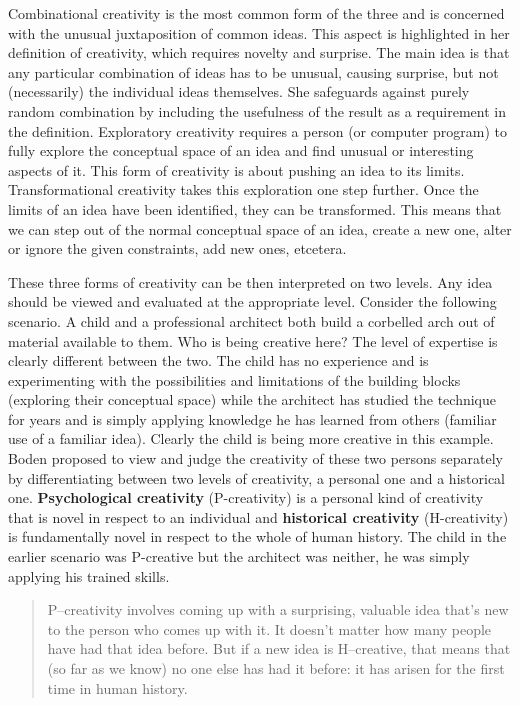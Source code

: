Combinational creativity is the most common form of the three and is concerned with the unusual juxtaposition of common ideas. This aspect is highlighted in her definition of creativity, which requires novelty and surprise. The main idea is that any particular combination of ideas has to be unusual, causing surprise, but not (necessarily) the individual ideas themselves. She safeguards against purely random combination by including the usefulness of the result as a requirement in the definition. Exploratory creativity requires a person (or computer program) to fully explore the conceptual space of an idea and find unusual or interesting aspects of it. This form of creativity is about pushing an idea to its limits. Transformational creativity takes this exploration one step further. Once the limits of an idea have been identified, they can be transformed. This means that we can step out of the normal conceptual space of an idea, create a new one, alter or ignore the given constraints, add new ones, etcetera.

These three forms of creativity can be then interpreted on two levels. Any idea should be viewed and evaluated at the appropriate level. Consider the following scenario. A child and a professional architect both build a corbelled arch out of material available to them. Who is being creative here? The level of expertise is clearly different between the two. The child has no experience and is experimenting with the possibilities and limitations of the building blocks (exploring their conceptual space) while the architect has studied the technique for years and is simply applying knowledge he has learned from others (familiar use of a familiar idea). Clearly the child is being more creative in this example. Boden proposed to view and judge the creativity of these two persons separately by differentiating between two levels of creativity, a personal one and a historical one. \textbf{Psychological creativity} (P-creativity) is a personal kind of creativity that is novel in respect to an individual and \textbf{historical creativity} (H-creativity) is fundamentally novel in respect to the whole of human history. The child in the earlier scenario was P-creative but the architect was neither, he was simply applying his trained skills.

\begin{quote}
	P–creativity involves coming up with a surprising, valuable idea that’s new to the person who comes up with it. It doesn’t matter how many people have had that idea before. But if a new idea is H–creative, that means that (so far as we know) no one else has had it before: it has arisen for the first time in human history. \citep{Boden2003}
\end{quote}

